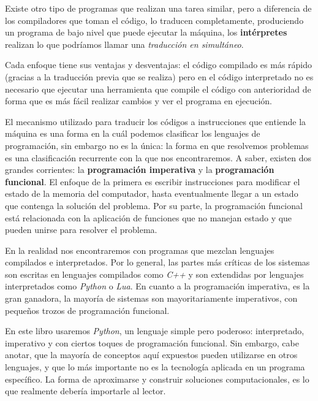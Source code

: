 Existe otro tipo de programas que realizan una tarea similar, pero a diferencia de los compiladores que toman el código, lo traducen completamente, produciendo un programa de bajo nivel que puede ejecutar la máquina, los \textbf{intérpretes} realizan lo que podríamos llamar una \emph{traducción en simultáneo}. 

Cada enfoque tiene sus ventajas y desventajas: el código compilado es más rápido (gracias a la traducción previa que se realiza) pero en el código interpretado no es necesario que ejecutar una herramienta que compile el código con anterioridad de forma que es más fácil realizar cambios y ver el programa en ejecución.

El mecanismo utilizado para traducir los códigos a instrucciones que entiende la máquina es una forma en la cuál podemos clasificar los lenguajes de programación, sin embargo no es la única: la forma en que resolvemos problemas es una clasificación recurrente con la que nos encontraremos. A saber, existen dos grandes corrientes: la \textbf{programación imperativa} y la \textbf{programación funcional}. El enfoque de la primera es escribir instrucciones para modificar el estado de la memoria del computador, hasta eventualmente llegar a un estado que contenga la solución del problema. Por su parte, la programación funcional está relacionada con la aplicación de funciones que no manejan estado y que pueden unirse para resolver el problema. 

En la realidad nos encontraremos con programas que mezclan lenguajes compilados e interpretados. Por lo general, las partes más críticas de los sistemas son escritas en lenguajes compilados como \emph{C++} y son extendidas por lenguajes interpretados como \emph{Python} o \emph{Lua}. En cuanto a la programación imperativa, es la gran ganadora, la mayoría de sistemas son mayoritariamente imperativos, con pequeños trozos de programación funcional.

En este libro usaremos \emph{Python}, un lenguaje simple pero poderoso: interpretado, imperativo y con ciertos toques de programación funcional. Sin embargo, cabe anotar, que la mayoría de conceptos aquí expuestos pueden utilizarse en otros lenguajes, y que lo más importante no es la tecnología aplicada en un programa específico. La forma de aproximarse y construir soluciones computacionales, es lo que realmente debería importarle al lector.


